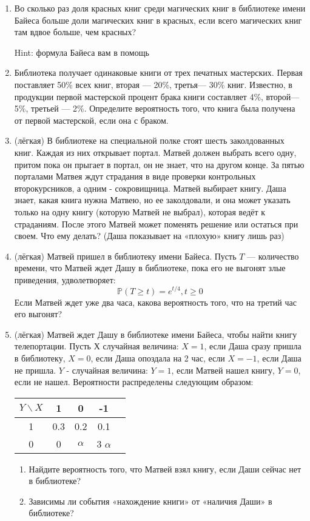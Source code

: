 \documentclass[a4paper,12pt]{article}
\def \P{\mathbb{P}}
\begin{document}
\begin{enumerate} %
\item
Во сколько раз доля красных книг среди магических книг в библиотеке имени Байеса
больше доли магических книг в красных, если всего магических книг
там вдвое больше, чем красных?

Hint: формула Байеса вам в помощь
\item
Библиотека получает одинаковые книги от трех печатных мастерских. Первая поставляет 50\% всех книг, вторая — 20\%, третья— 30\% книг.
Известно, в продукции первой мастерской процент брака книги составляет 4\%, второй— 5\%, третьей — 2\%. Определите вероятность того, что книга была получена от первой мастерской, если она с браком.
\item (лёгкая)
В библиотеке на специальной полке стоят шесть заколдованных книг. Каждая из них открывает портал. Матвей должен выбрать всего одну, притом пока он прыгает в портал, он не знает, что на другом конце. За пятью порталами Матвея ждут страдания в виде проверки контрольных второкурсников, а одним - сокровищница. Матвей выбирает книгу. Даша знает, какая книга нужна Матвею, но ее заколдовали, и она может указать только на одну книгу  (которую Матвей не выбрал), которая ведёт к страданиям. После этого Матвей может поменять решение или остаться при своем. Что ему делать? (Даша показывает на «плохую» книгу лишь раз)
\item (лёгкая)
Матвей пришел в библиотеку имени Байеса. Пусть $T$ — количество времени, что Матвей ждет Дашу в библиотеке, пока его не выгонят злые приведения, удволетворяет:
\[
\P(T \ge t) = e^{t/4}, t\ge 0
\]
Если Матвей ждет уже два часа, какова вероятность того, что на третий час его выгонят?
\item (лёгкая)
Матвей ждет Дашу в библиотеке имени Байеса, чтобы найти книгу телепортации. Пусть $Х$ случайная величина: $X = 1$, если Даша сразу пришла в библиотеку, $X = 0$, если Даша опоздала на 2 час, если $X=-1$, если Даша не пришла. $Y$ - случайная величина: $Y=1$, если Матвей нашел книгу, $Y=0$, если не нашел. Вероятности распределены следующим образом:
\begin{center}
	\begin{tabular}{ccccc}
		\toprule
		$Y\backslash X$ & 1 & 0 & -1\\
		\midrule
		1 & 0.3 & 0.2& 0.1\\
		0 & 0  & $\alpha$ & 3 $\alpha$ \\
		\bottomrule
	\end{tabular}
\end{center}

\begin{enumerate}
    \item Найдите вероятность того, что Матвей взял книгу, если Даши сейчас нет в библиотеке?
    \item Зависимы ли события «нахождение книги» от «наличия Даши» в библиотеке?
\end{enumerate}

\end{enumerate}
\end{document}
